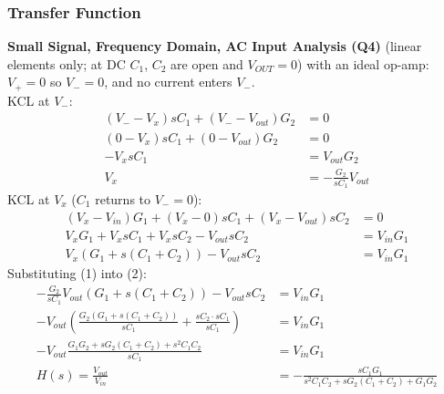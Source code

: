 \subsubsection{Transfer Function}
\textbf{Small Signal, Frequency Domain, AC Input Analysis (Q4)} (linear elements only; at DC
\(C_1\), \(C_2\) are open and \(V_{OUT} = 0\)) with an ideal op-amp: \(V_+ = 0\) so \(V_- = 0\), and no
current enters \(V_-\).\\
KCL at \(V_-\):
\begin{align*}
  (V_- - V_x) sC_1 + (V_- - V_{out}) G_2 &= 0 \\
  (0 - V_x) sC_1 + (0 - V_{out}) G_2 &= 0 \\
  -V_x sC_1 &= V_{out} G_2 \\
  V_x &= -\frac{G_2}{sC_1} V_{out} \tag{1}
\end{align*}
KCL at \(V_x\) (\(C_1\) returns to \(V_- = 0\)):
\begin{align*}
  (V_x - V_{in}) G_1 + (V_x - 0) sC_1 + (V_x - V_{out}) sC_2 &= 0 \\
  V_x G_1 + V_x sC_1 + V_x sC_2 - V_{out} sC_2 &= V_{in} G_1 \\
  V_x (G_1 + s(C_1 + C_2)) - V_{out} sC_2 &= V_{in} G_1 \tag{2}
\end{align*}
Substituting (1) into (2):
\begin{align*}
  -\frac{G_2}{sC_1} V_{out}(G_1 + s(C_1 + C_2)) - V_{out} sC_2 &= V_{in} G_1 \\
  -V_{out}\left(\frac{G_2 (G_1 + s(C_1 + C_2))}{sC_1} + \frac{sC_2 \cdot sC_1}{sC_1}\right) &= V_{in} G_1 \\
  -V_{out}\frac{G_1 G_2 + s G_2 (C_1 + C_2) + s^2 C_1 C_2}{sC_1} &= V_{in} G_1 \\
  H(s) = \frac{V_{out}}{V_{in}} &= -\frac{s C_1 G_1}{s^2 C_1 C_2 + s G_2 (C_1 + C_2) + G_1 G_2} \tag{3}
\end{align*}

